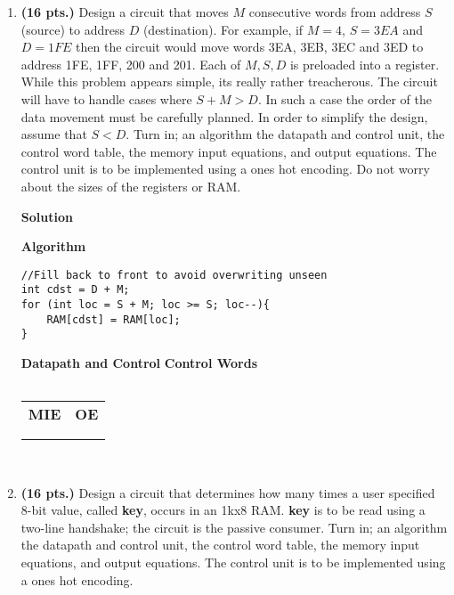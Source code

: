 \begin{enumerate}
    \item \textbf{ (16 pts.)}
        Design a circuit that moves $M$ consecutive words from address $S$ (source) to
        address $D$ (destination).  For example, if $M=4$, $S=3EA$ and $D=1FE$ then the
        circuit would move words 3EA, 3EB, 3EC and 3ED to address 1FE, 1FF, 200 and 201.
        Each of $M,S,D$ is preloaded into a register.  While this problem appears simple,
        its really rather treacherous.  The circuit will have to handle cases where
        $S+M > D$.  In such a case the order of the data movement must be carefully planned.
        In order to simplify the design, assume that $S<D$.
        Turn in; an algorithm the datapath and control unit, the control word
        table, the memory input equations, and output equations.
        The control unit is to be implemented using a ones hot encoding.
        Do not worry about the sizes of the
        registers or RAM.
        \begin{onlysolution}[fragile]\textbf{Solution}\par
            \textbf{Algorithm}
\begin{verbatim}
//Fill back to front to avoid overwriting unseen
int cdst = D + M;
for (int loc = S + M; loc >= S; loc--){
    RAM[cdst] = RAM[loc];
}
\end{verbatim}
            \textbf{Datapath and Control}
            \textbf{Control Words}
            \begin{tabular}{c}
            \end{tabular}
            \begin{tabular}{cc}
                \textbf{MIE} & \textbf{OE} \\
                {$
                    \begin{aligned}
                \end{aligned}$} &
                {$
                    \begin{aligned}
                \end{aligned}$}
            \end{tabular}\\
        \end{onlysolution}

    \item \textbf{ (16 pts.)}
        Design a circuit that determines how many times a user
        specified 8-bit value, called \textbf{key}, occurs in an 1kx8 RAM.
        \textbf{key} is to be read using a two-line handshake; the circuit
        is the passive consumer.
        Turn in; an algorithm the datapath and control unit, the control word
        table, the memory input equations, and output equations.
        The control unit is to be implemented using a ones hot encoding.


\end{enumerate}
